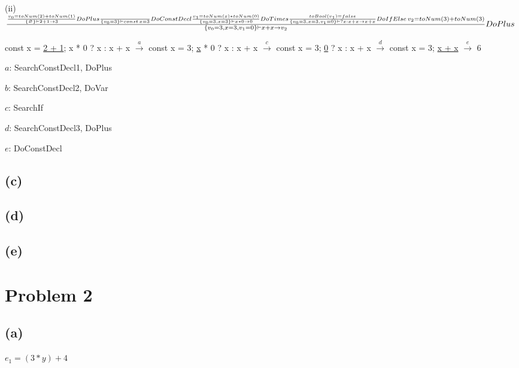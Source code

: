 \documentclass[11pt, oneside]{article}
\let\emptyset\varnothing
\newcommand{\forceindent}{\leavevmode{\parindent=1.5em\indent}}
\begin{document}
\vspace{1.5\baselineskip}

\par (ii)
$
\frac{
	\frac {
		v_0 = toNum(2) + toNum(1)
	}
	{
		\{\emptyset\} \vdash 2 + 1 \rightarrow 3
	} DoPlus
	\frac {
	}
	{
		\{v_0 = 3\} \vdash const \thinspace x = 3
	} DoConstDecl
	\frac {
		v_1 = toNum(x) * toNum(0)
	}
	{
		\{v_0 = 3, x = 3\} \vdash x * 0 \rightarrow 0
	} DoTimes
	\frac {
		toBool(v_1) = false
	}
	{
		\{v_0 = 3, x = 3, v_1 = 0\} \vdash ? x : x + x \rightarrow x + x
	} DoIfElse
	\thinspace
	v_2 = toNum(3) + toNum(3)
}{
	\{v_0 = 3, x = 3, v_1 = 0\} \vdash x + x \rightarrow v_2
} DoPlus
$

\vspace{1.5\baselineskip}

\par const x = \underline{2 + 1}; x * 0 ? x : x + x $\xrightarrow{a}$ const x = 3; \underline{x} * 0 ? x : x + x $\xrightarrow{c}$ const x = 3; \underline{0} ? x : x + x $\xrightarrow{d}$ const x = 3; \underline{x + x} $\xrightarrow{e}$ 6
\par $a$: SearchConstDecl1, DoPlus
\par $b$: SearchConstDecl2, DoVar
\par $c$: SearchIf
\par $d$: SearchConstDecl3, DoPlus
\par $e$: DoConstDecl

\subsection*{(c)}
\forceindent \par

\subsection*{(d)}
\forceindent \par

\subsection*{(e)}
\forceindent \par

\section{Problem 2}
\subsection*{(a)}
\forceindent \par $e_1 = (3 * y) + 4$
\end{document}
